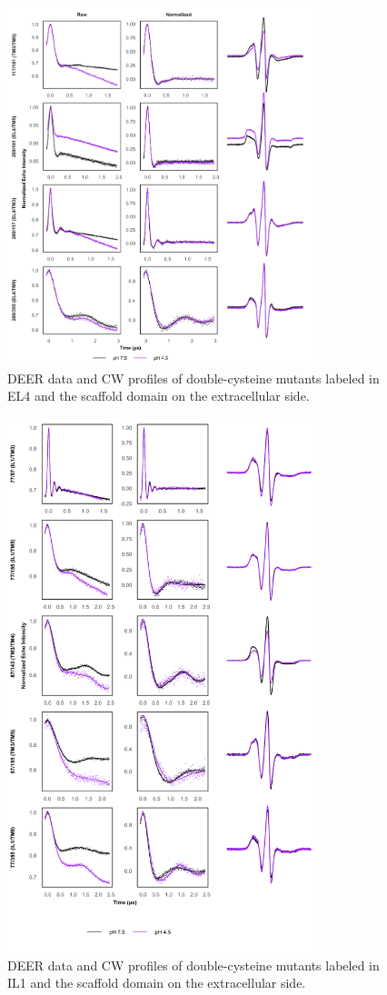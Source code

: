 \begin{figure}[h]
\centering
\includegraphics[width=3.5in]{Figures/gadc_supp_el4.png}
\caption[DEER data and CW profiles of double-cysteine mutants labeled in EL4 and the scaffold domain on the extracellular side.]{DEER data and CW profiles of double-cysteine mutants labeled in EL4 and the scaffold domain on the extracellular side.}
\label{fig:gadc_supp_el4}
\end{figure}

\begin{figure}[h]
\centering
\includegraphics[width=3.5in]{Figures/gadc_supp_il1.pdf}
\caption[DEER data and CW profiles of double-cysteine mutants labeled in IL1 and the scaffold domain on the extracellular side.]{DEER data and CW profiles of double-cysteine mutants labeled in IL1 and the scaffold domain on the extracellular side.}
\label{fig:gadc_supp_il1}
\end{figure}

